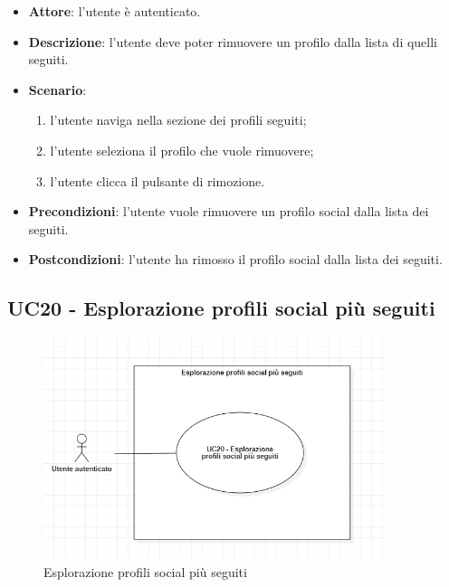 \begin{itemize}
    \item \textbf{Attore}: l'utente è autenticato.
    \item \textbf{Descrizione}: l'utente deve poter rimuovere un profilo dalla lista di quelli seguiti.
    \item \textbf{Scenario}:
    \begin{enumerate}
        \item l'utente naviga nella sezione dei profili seguiti;
        \item l'utente seleziona il profilo che vuole rimuovere;
        \item l'utente clicca il pulsante di rimozione.
    \end{enumerate}

    \item \textbf{Precondizioni}: l'utente vuole rimuovere un profilo social dalla lista dei seguiti.
    \item \textbf{Postcondizioni}: l'utente ha rimosso il profilo social dalla lista dei seguiti.
\end{itemize}

\subsection{UC20 - Esplorazione profili social più seguiti}

\begin{figure}[!h]
    \includegraphics[width=10cm]{sezioni/Images/UC20.png}
    \centering
    \caption{Esplorazione profili social più seguiti}
\end{figure}

